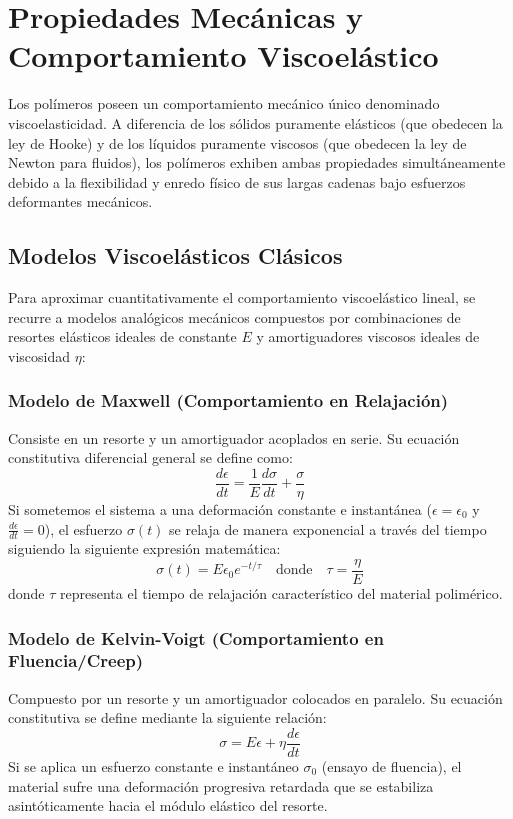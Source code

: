 \chapter{Propiedades Mecánicas y Comportamiento Viscoelástico}
\label{cap:mecanicas}

Los polímeros poseen un comportamiento mecánico único denominado viscoelasticidad. A diferencia de los sólidos puramente elásticos (que obedecen la ley de Hooke) y de los líquidos puramente viscosos (que obedecen la ley de Newton para fluidos), los polímeros exhiben ambas propiedades simultáneamente debido a la flexibilidad y enredo físico de sus largas cadenas bajo esfuerzos deformantes mecánicos.

\section{Modelos Viscoelásticos Clásicos}

Para aproximar cuantitativamente el comportamiento viscoelástico lineal, se recurre a modelos analógicos mecánicos compuestos por combinaciones de resortes elásticos ideales de constante $E$ y amortiguadores viscosos ideales de viscosidad $\eta$:

\subsection{Modelo de Maxwell (Comportamiento en Relajación)}
Consiste en un resorte y un amortiguador acoplados en serie. Su ecuación constitutiva diferencial general se define como:
\begin{equation}
    \frac{d\epsilon}{dt} = \frac{1}{E} \frac{d\sigma}{dt} + \frac{\sigma}{\eta}
    \label{eq:maxwell}
\end{equation}
Si sometemos el sistema a una deformación constante e instantánea ($\epsilon = \epsilon_0$ y $\frac{d\epsilon}{dt} = 0$), el esfuerzo $\sigma(t)$ se relaja de manera exponencial a través del tiempo siguiendo la siguiente expresión matemática:
\begin{equation}
    \sigma(t) = E \epsilon_0 e^{-t/\tau} \quad \text{donde} \quad \tau = \frac{\eta}{E}
    \label{eq:relajacion_maxwell}
\end{equation}
donde $\tau$ representa el tiempo de relajación característico del material polimérico.

\subsection{Modelo de Kelvin-Voigt (Comportamiento en Fluencia/Creep)}
Compuesto por un resorte y un amortiguador colocados en paralelo. Su ecuación constitutiva se define mediante la siguiente relación:
\begin{equation}
    \sigma = E\epsilon + \eta \frac{d\epsilon}{dt}
    \label{eq:kelvin_voigt}
\end{equation}
Si se aplica un esfuerzo constante e instantáneo $\sigma_0$ (ensayo de fluencia), el material sufre una deformación progresiva retardada que se estabiliza asintóticamente hacia el módulo elástico del resorte.

